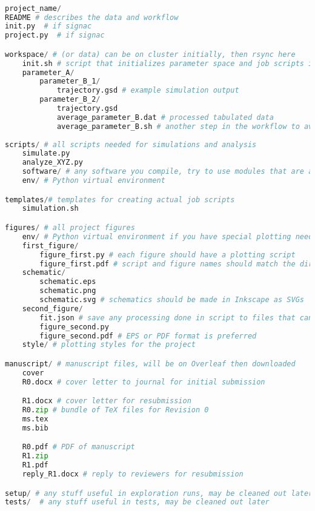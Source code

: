 \documentclass{article}
\begin{document}
\begin{lstlisting}[language=Python]

project_name/
README # describes the data and workflow
init.py  # if signac
project.py  # if signac

workspace/ # (or data) can be on cluster initially, then rsync here
	init.sh # script that initializes parameter space and job scripts if needed
	parameter_A/
		parameter_B_1/
			trajectory.gsd # example simulation output
		parameter_B_2/
			trajectory.gsd
			average_parameter_B.dat # processed tabulated data
			average_parameter_B.sh # another step in the workflow to average results
			
scripts/ # all scripts needed for simulations and analysis
	simulate.py
	analyze_XYZ.py 
	software/ # any software you compile, try to use modules that are available
	env/ # Python virtual environment

templates/# templates for creating actual job scripts
	simulation.sh

figures/ # all project figures
	env/ # Python virtual environment if you have special plotting needs
	first_figure/
		figure_first.py # each figure should have a plotting script
		figure_first.pdf # script and figure names should match the directory
	schematic/
		schematic.eps
		schematic.png
		schematic.svg # schematics should be made in Inkscape as SVGs
	second_figure/
		fit.json # save any processing done in script to files that can be read
		figure_second.py
		figure_second.pdf # EPS or PDF format is preferred
	style/ # plotting styles for the project

manuscript/ # manuscript files, will be on Overleaf then downloaded
	cover
	R0.docx # cover letter to journal for initial submission

	R1.docx # cover letter for resubmission
	R0.zip # bundle of TeX files for Revision 0
	ms.tex
	ms.bib

	R0.pdf # PDF of manuscript
	R1.zip
	R1.pdf
	reply_R1.docx # reply to reviewers for resubmission

setup/ # any stuff useful in exploration runs, may be cleaned out later
tests/  # any stuff useful in tests, may be cleaned out later

\end{lstlisting}
\end{document}
